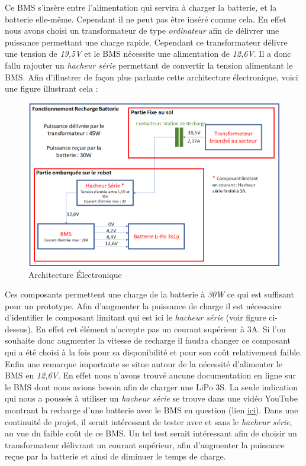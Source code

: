 \documentclass[french]{rapportENSTAB}
\begin{document}
Ce BMS s'insère entre l'alimentation qui servira à charger la batterie, et la batterie elle-même. Cependant il ne peut pas être inséré comme cela. En effet nous avons choisi un transformateur de type \textit{ordinateur} afin de délivrer une puissance permettant une charge rapide. Cependant ce transformateur délivre une tension de \textit{19,5V} et le BMS nécessite une alimentation de \textit{12,6V}. Il a donc fallu rajouter un \textit{hacheur série} permettant de convertir la tension alimentant le BMS. Afin d'illustrer de façon plus parlante cette architecture électronique, voici une figure illustrant cela :
\begin{figure}[H]
    \centering
    \includegraphics[scale=0.75]{images/station de recharge/Archi 2.png}
    \caption{Architecture Électronique}
    \label{fig:archi elec}
\end{figure}

Ces composants permettent une charge de la batterie à \textit{30W} ce qui est suffisant pour un prototype. Afin d'augmenter la puissance de charge il est nécessaire d'identifier le composant limitant qui est ici le \textit{hacheur série} (voir figure ci-dessus). En effet cet élément n'accepte pas un courant supérieur à 3A. Si l'on souhaite donc augmenter la vitesse de recharge il faudra changer ce composant qui a été choisi à la fois pour sa disponibilité et pour son coût relativement faible.\\

Enfin une remarque importante se situe autour de la nécessité d'alimenter le BMS en \textit{12,6V}. En effet nous n'avons trouvé aucune documentation en ligne sur le BMS dont nous avions besoin afin de charger une LiPo 3S. La seule indication qui nous a poussés à utiliser un \textit{hacheur série} se trouve dans une vidéo YouTube montrant la recharge d'une batterie avec le BMS en question (lien \href{https://www.youtube.com/watch?v=ySXtBuawf70}{ici}). Dans une continuité de projet, il serait intéressant de tester avec et sans le \textit{hacheur série}, au vue du faible coût de ce BMS. Un tel test serait intéressant afin de choisir un transformateur délivrant un courant supérieur, afin d'augmenter la puissance reçue par la batterie et ainsi de diminuer le temps de charge.
\end{document}
